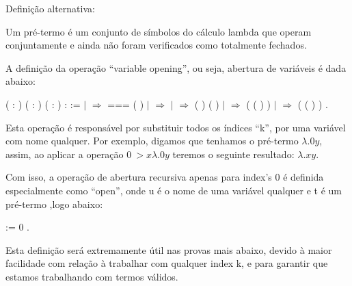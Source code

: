 Definição alternativa:


Um pré-termo é um conjunto de símbolos do cálculo lambda que operam conjuntamente e ainda
não foram verificados como totalmente fechados.\begin{coqdoccode}
\coqdocemptyline
\coqdocemptyline
\end{coqdoccode}
A definição da operação ``variable opening'', ou seja, abertura de variáveis é dada abaixo:\begin{coqdoccode}
\coqdocemptyline
\coqdocnoindent
{}  ( : ) ( : ) ( : ) :  :=\coqdoceol
\coqdocindent{1.00em}
  \coqdoceol
\coqdocindent{1.00em}
\ensuremath{|}      \ensuremath{\Rightarrow}   ===     ( )\coqdoceol
\coqdocindent{1.00em}
\ensuremath{|}      \ensuremath{\Rightarrow}  \coqdoceol
\coqdocindent{1.00em}
\ensuremath{|}    \ensuremath{\Rightarrow}  (   ) (   )\coqdoceol
\coqdocindent{1.00em}
\ensuremath{|}      \ensuremath{\Rightarrow}  ( ( )  )\coqdoceol
\coqdocindent{1.00em}
\ensuremath{|}      \ensuremath{\Rightarrow}  ( ( )  )\coqdoceol
\coqdocindent{1.00em}
.\coqdoceol
\coqdocemptyline
\end{coqdoccode}
Esta operação é responsável por substituir todos os índices ``k'', por uma variável com
nome qualquer. Por exemplo, digamos que tenhamos o pré-termo $\lambda.0 y$, assim, ao aplicar
a operação $ {0 ~> x} \lambda.0 y$ teremos o seguinte resultado: $\lambda.x y$.

 Com isso, a operação de abertura recursiva apenas para index's 0 é definida especialmente 
como ``open'', onde u é o nome de uma variável qualquer e t é um pré-termo ,logo abaixo:\begin{coqdoccode}
\coqdocemptyline
\coqdocnoindent
{}    :=  0  .\coqdoceol
\coqdocemptyline
\end{coqdoccode}
Esta definição será extremamente útil nas provas mais abaixo, devido à maior facilidade com relação
à trabalhar com qualquer index k, e para garantir que estamos trabalhando com termos válidos.

